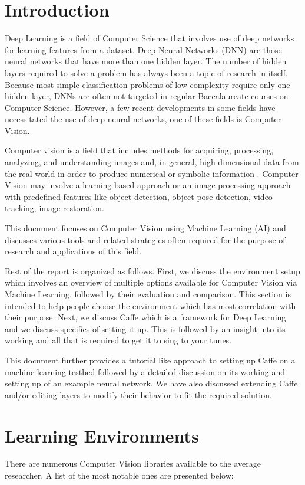 \documentclass{article}
\begin{document}
\section{Introduction}
Deep Learning is a field of Computer Science that involves use of deep networks for learning features from a dataset. Deep Neural Networks (DNN) are those neural networks that have more than one hidden layer. The number of hidden layers required to solve a problem has always been a topic of research in itself. Because most simple classification problems of low complexity require only one hidden layer, DNNs are often not targeted in regular Baccalaureate courses on Computer Science. However, a few recent developments in some fields have necessitated the use of deep neural networks, one of these fields is Computer Vision.
\par
Computer vision is a field that includes methods for acquiring, processing, analyzing, and understanding images and, in general, high-dimensional data from the real world in order to produce numerical or symbolic information \cite{ComputerVision:wiki}. Computer Vision may involve a learning based approach or an image processing approach with predefined features like object detection, object pose detection, video tracking, image restoration.
\par
This document focuses on Computer Vision using Machine Learning (AI) and discusses various tools and related strategies often required for the purpose of research and applications of this field.
\par
Rest of the report is organized as follows. First, we discuss the environment setup which involves an overview of multiple options available for Computer Vision via Machine Learning, followed by their evaluation and comparison. This section is intended to help people choose the environment which has most correlation with their purpose. Next, we discuss Caffe \cite{caffe} which is a framework for Deep Learning and we discuss specifics of setting it up. This is followed by an insight into its working and all that is required to get it to sing to your tunes.
\par
This document further provides a tutorial like approach to setting up Caffe on a machine learning testbed followed by a detailed discussion on its working and setting up of an example neural network. We have also discussed extending Caffe and/or editing layers to modify their behavior to fit the required solution.

\section{Learning Environments}
There are numerous Computer Vision libraries available to the average researcher. A list of the most notable ones are presented below:
\end{document}
